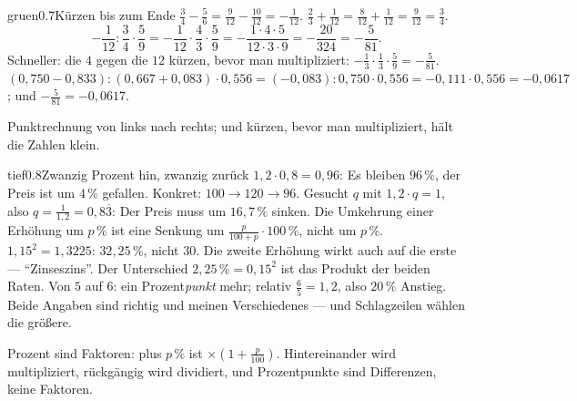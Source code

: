 \begin{loesungkarte}{gruen}{0.7}{Kürzen bis zum Ende}
$\frac34 - \frac56 = \frac9{12} - \frac{10}{12} = -\frac1{12}$. \quad $\frac23 + \frac1{12} = \frac8{12} + \frac1{12} = \frac9{12} = \frac34$.
\[ -\frac1{12} : \frac34\cdot\frac59 = -\frac1{12}\cdot\frac43\cdot\frac59 = -\frac{1\cdot4\cdot5}{12\cdot3\cdot9} = -\frac{20}{324} = -\frac5{81} . \]
Schneller: die $4$ gegen die $12$ kürzen, bevor man multipliziert: $-\frac1{3}\cdot\frac13\cdot\frac59 = -\frac5{81}$.
$(0{,}750 - 0{,}833) : (0{,}667 + 0{,}083)\cdot0{,}556 = (-0{,}083) : 0{,}750\cdot0{,}556 = -0{,}111\cdot0{,}556 = -0{,}0617$; und $-\frac5{81} = -0{,}0617$. \checkmark
{}
\begin{mitnehmen}\kastentext
Punktrechnung von links nach rechts; und kürzen, bevor man multipliziert, hält die Zahlen klein.
\end{mitnehmen}
\end{loesungkarte}

\begin{loesungkarte}{tief}{0.8}{Zwanzig Prozent hin, zwanzig zurück}
$1{,}2\cdot0{,}8 = 0{,}96$: Es bleiben $96\,\%$, der Preis ist um $4\,\%$ gefallen. Konkret: $100\to120\to96$.
Gesucht $q$ mit $1{,}2\cdot q = 1$, also $q = \frac1{1{,}2} = 0{,}8\overline3$: Der Preis muss um $16{,}7\,\%$ sinken. Die Umkehrung einer Erhöhung um $p\,\%$ ist eine Senkung um $\frac{p}{100 + p}\cdot100\,\%$, nicht um $p\,\%$.
$1{,}15^{2} = 1{,}3225$: $32{,}25\,\%$, nicht $30$. Die zweite Erhöhung wirkt auch auf die erste --- \enquote{Zinseszins}. Der Unterschied $2{,}25\,\% = 0{,}15^{2}$ ist das Produkt der beiden Raten.
Von $5$ auf $6$: ein Prozent\emph{punkt} mehr; relativ $\frac65 = 1{,}2$, also $20\,\%$ Anstieg. Beide Angaben sind richtig und meinen Verschiedenes --- und Schlagzeilen wählen die größere.
\begin{mitnehmen}\kastentext
Prozent sind Faktoren: plus $p\,\%$ ist $\times(1 + \frac p{100})$. Hintereinander wird multipliziert, rückgängig wird dividiert, und Prozentpunkte sind Differenzen, keine Faktoren.
\end{mitnehmen}
\end{loesungkarte}

